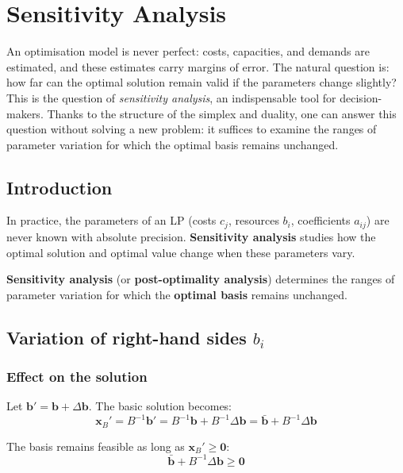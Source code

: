 \chapter{Sensitivity Analysis}
\label{ch:sensitivity}

An optimisation model is never perfect: costs, capacities, and demands are estimated, and these estimates carry margins of error. The natural question is: how far can the optimal solution remain valid if the parameters change slightly? This is the question of \emph{sensitivity analysis}, an indispensable tool for decision-makers. Thanks to the structure of the simplex and duality, one can answer this question without solving a new problem: it suffices to examine the ranges of parameter variation for which the optimal basis remains unchanged.

\section{Introduction}

In practice, the parameters of an LP (costs $c_j$, resources $b_i$,
coefficients $a_{ij}$) are never known with absolute precision.
\textbf{Sensitivity analysis} studies how the optimal solution and optimal
value change when these parameters vary.

\begin{definition}
\textbf{Sensitivity analysis} (or \textbf{post-optimality analysis})
determines the ranges of parameter variation for which the \textbf{optimal
basis} remains unchanged.
\end{definition}

\section{Variation of right-hand sides $b_i$}

\subsection{Effect on the solution}

Let $\mathbf{b}' = \mathbf{b} + \Delta\mathbf{b}$.  The basic solution
becomes:
\[
  \mathbf{x}_B' = B^{-1}\mathbf{b}' = B^{-1}\mathbf{b} + B^{-1}\Delta\mathbf{b}
  = \bar{\mathbf{b}} + B^{-1}\Delta\mathbf{b}
\]

The basis remains feasible as long as $\mathbf{x}_B' \ge \mathbf{0}$:
\[
  \bar{\mathbf{b}} + B^{-1}\Delta\mathbf{b} \ge \mathbf{0}
\]

